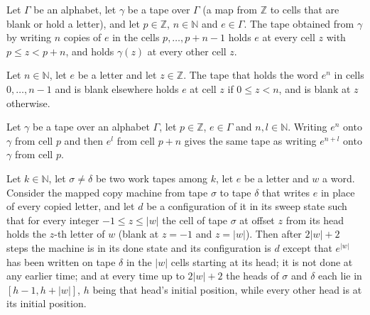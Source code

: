 \begin{lemma}
\label{Turing.cw_patch_rep}
\leanok
{}
Let $\Gamma$ be an alphabet, let $\gamma$ be a tape over $\Gamma$ (a map from $\mathbb{Z}$ to
cells that are blank or hold a letter), and let $p\in\mathbb{Z}$, $n\in\mathbb{N}$ and
$e\in\Gamma$. The tape obtained from $\gamma$ by writing $n$ copies of $e$ in the cells
$p,\dots,p+n-1$ holds $e$ at every cell $z$ with $p\le z<p+n$, and holds $\gamma(z)$ at every
other cell $z$.
\end{lemma}

\begin{lemma}
\label{Turing.cw_buffer_rep}
\leanok
{}
Let $n\in\mathbb{N}$, let $e$ be a letter and let $z\in\mathbb{Z}$. The tape that holds the
word $e^n$ in cells $0,\dots,n-1$ and is blank elsewhere holds $e$ at cell $z$ if $0\le z<n$,
and is blank at $z$ otherwise.
\end{lemma}

\begin{lemma}
\label{Turing.cw_join}
\leanok
{}
Let $\gamma$ be a tape over an alphabet $\Gamma$, let $p\in\mathbb{Z}$, $e\in\Gamma$ and
$n,l\in\mathbb{N}$. Writing $e^n$ onto $\gamma$ from cell $p$ and then $e^l$ from cell $p+n$
gives the same tape as writing $e^{n+l}$ onto $\gamma$ from cell $p$.
\end{lemma}

\begin{lemma}
\label{Turing.cw_copy_constant}
\leanok
{}
Let $k\in\mathbb{N}$, let $\sigma\ne\delta$ be two work tapes among $k$, let $e$ be a letter
and $w$ a word. Consider the mapped copy machine from tape $\sigma$ to tape $\delta$ that
writes $e$ in place of every copied letter, and let $d$ be a configuration of it in its sweep
state such that for every integer $-1\le z\le|w|$ the cell of tape $\sigma$ at offset $z$ from
its head holds the $z$-th letter of $w$ (blank at $z=-1$ and $z=|w|$). Then after $2|w|+2$
steps the machine is in its done state and its configuration is $d$ except that $e^{|w|}$ has
been written on tape $\delta$ in the $|w|$ cells starting at its head; it is not done at any
earlier time; and at every time up to $2|w|+2$ the heads of $\sigma$ and $\delta$ each lie in
$[h-1,h+|w|]$, $h$ being that head's initial position, while every other head is at its initial
position.
\end{lemma}

